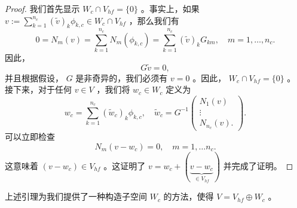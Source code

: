 \documentclass[12pt]{acta_2011xz}
\newcommand{\dof}{\ensuremath{N}}
\begin{document}
   \begin{proof}我们首先显示    $W_c\cap V_{hf}= \{ 0 \} $    。事实上，如果
   $v:=\sum_{k=1}^{n_c}(\tilde v)_k\phi _{k,c}\in W_c\cap V_{hf}$    ，那么我们有
   $$
    0=\dof_m(v)=\sum_{k=1}^{n_c}\dof_m(\phi_{k,c})=\sum_{k=1}^{n_c}(\tilde v)_kG_{km}, \quad m=1, \dots,
n_c.
$$    因此，
   $$
G\tilde v=0,
$$    并且根据假设，   $G$    是非奇异的，我们必须有    $v=0$    。因此，
   $W_c\cap V_{hf}= \{ 0 \} $    。
接下来，对于任何    $v\in V$    ，我们将    $w_c\in W_c$    定义为
   \[ w_c = \sum_{k=1}^{n_c} (\widetilde{w}_c)_k\phi_{k,c}, \quad
\widetilde{w}_c= G^{-1}
    \begin{pmatrix} \dof_1(v)  \\  \vdots \\ 
        \dof_{n_c}(v).
\end{pmatrix}.
\]    可以立即检查
   \[ \dof_m (v-w_c) = 0, \quad m=1,\ldots
n_c.
\]    这意味着    $(v-w_c)\in V_{hf}$    。这证明了    $v=w_c +
(\underbrace{v-w_c}_{\in V_{hf}})$    并完成了证明。  \end{proof}     

上述引理为我们提供了一种构造子空间    $W_c$    的方法，使得
   $V=V_{hf}\oplus W_c$    。  
\end{document}
